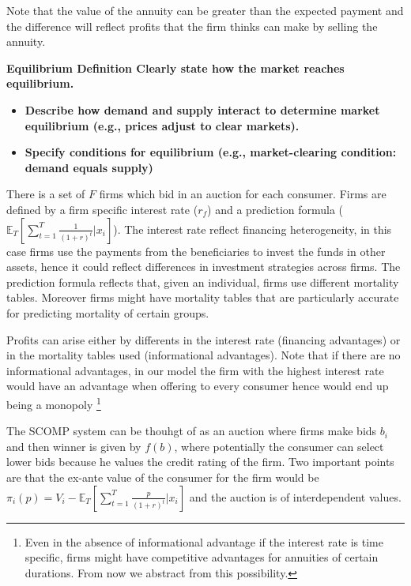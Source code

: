 \documentclass[12pt]{article}
\theoremstyle{plain}
\theoremstyle{plain}
\begin{document}
Note that the value of the annuity can be greater than the expected payment and the difference will reflect profits that the firm thinks can make by selling the annuity.  

 
\textbf{Equilibrium Definition Clearly state how the market reaches equilibrium.}
\begin{itemize}
    \item \textbf{Describe how demand and supply interact to determine market equilibrium (e.g., prices adjust to clear markets).}

    \item \textbf{Specify conditions for equilibrium (e.g., market-clearing condition: demand equals supply)}
\end{itemize}


There is a set of $F$ firms which bid in an auction for each consumer. Firms are defined by a firm specific interest rate ($r_f$) and a prediction formula ($\mathbb{E}_{T}\left[\sum_{t=1}^T\frac{1}{(1+r)^t}| x_i\right]$). The interest rate reflect financing heterogeneity, in this case firms use the payments from the beneficiaries to invest the funds in other assets, hence it could reflect differences in investment strategies across firms. The prediction formula reflects that, given an individual, firms use different mortality tables. Moreover firms might have mortality tables that are particularly accurate for predicting mortality of certain groups. 



Profits can arise either by differents in the interest rate  (financing advantages) or in the mortality tables used (informational advantages). Note that if there are no informational advantages, in our model the firm with the highest interest rate would have an advantage when offering to every consumer hence would end up being a monopoly \footnote{Even in the absence of informational advantage if the interest rate is time specific, firms might have competitive advantages for annuities of certain durations. From now we abstract from this possibility.}

The SCOMP system can be thouhgt of as an auction where firms make bids $b_i$ and then winner is given by $f(b)$, where potentially the consumer can select lower bids because he values the credit rating of the firm. Two important points are that the ex-ante value of the consumer for the firm would be $\pi_i(p) =V_i- \mathbb{E}_{T} \left[ \sum_{t=1}^T\frac{p}{(1+r)^t}| x_i\right]$ and the auction is of interdependent values. 
\end{document}

